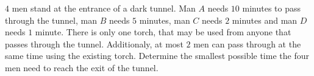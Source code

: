 $4$ men stand at the entrance of a dark tunnel. Man $A$ needs $10$ minutes to pass through the tunnel, man $B$ needs $5$ minutes, man $C$ needs $2$ minutes and man $D$ needs $1$  minute. There is only one torch, that may be used from anyone that passes through the tunnel. Additionaly,  at most $2$ men can pass through at the same time using the existing torch.
Determine the smallest possible time the four men need to reach the exit of the tunnel.